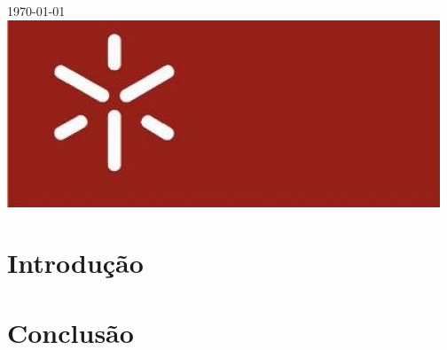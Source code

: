 \documentclass[12pt]{article}
\begin{document}
\begin{titlepage}

{\large \today}\\[2cm]


\includegraphics[scale=0.3]{uminho}\\
    

\vfill %

\end{titlepage}
\tableofcontents
\newpage
\section{Introdução}
\section{Conclusão}
\end{document}
